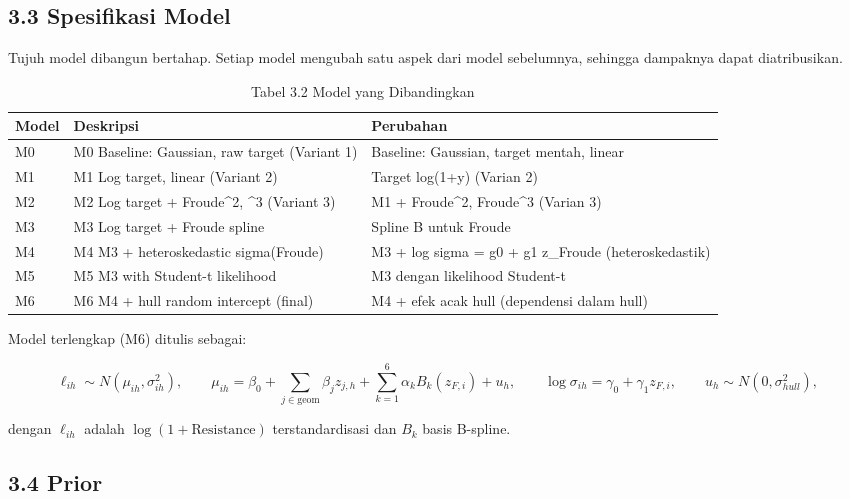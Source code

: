 \documentclass[
]{article}
\begin{document}
\subsection{3.3 Spesifikasi Model}\label{spesifikasi-model}

Tujuh model dibangun bertahap. Setiap model mengubah satu aspek dari
model sebelumnya, sehingga dampaknya dapat diatribusikan.

\begingroup\fontsize{8.5}{10.5}\selectfont

\begin{longtable}[t]{>{\raggedright\arraybackslash}p{2.00cm}>{\raggedright\arraybackslash}p{6.80cm}>{\raggedright\arraybackslash}p{6.80cm}}
\caption{\label{tab:tabel_model}Tabel 3.2 Model yang Dibandingkan}\\
\toprule
Model & Deskripsi & Perubahan\\
\midrule
M0 & M0 Baseline: Gaussian, raw target (Variant 1) & Baseline: Gaussian, target mentah, linear\\
M1 & M1 Log target, linear (Variant 2) & Target log(1+y) (Varian 2)\\
M2 & M2 Log target + Froude\textasciicircum{}2, \textasciicircum{}3 (Variant 3) & M1 + Froude\textasciicircum{}2, Froude\textasciicircum{}3 (Varian 3)\\
M3 & M3 Log target + Froude spline & Spline B untuk Froude\\
M4 & M4 M3 + heteroskedastic sigma(Froude) & M3 + log sigma = g0 + g1 z\_Froude (heteroskedastik)\\
\addlinespace
M5 & M5 M3 with Student-t likelihood & M3 dengan likelihood Student-t\\
M6 & M6 M4 + hull random intercept (final) & M4 + efek acak hull (dependensi dalam hull)\\
\bottomrule
\end{longtable}
\endgroup{}

Model terlengkap (M6) ditulis sebagai:

\[\ell_{ih}\sim N(\mu_{ih},\sigma_{ih}^2),\qquad \mu_{ih}=\beta_0+\sum_{j\in\text{geom}}\beta_j z_{j,h}+\sum_{k=1}^{6}\alpha_k B_k(z_{F,i})+u_h,\qquad \log\sigma_{ih}=\gamma_0+\gamma_1 z_{F,i},\qquad u_h\sim N(0,\sigma_{hull}^2),\]

dengan \(\ell_{ih}\) adalah \(\log(1+\text{Resistance})\)
terstandardisasi dan \(B_k\) basis B-spline.

\subsection{3.4 Prior}\label{prior}
\end{document}
